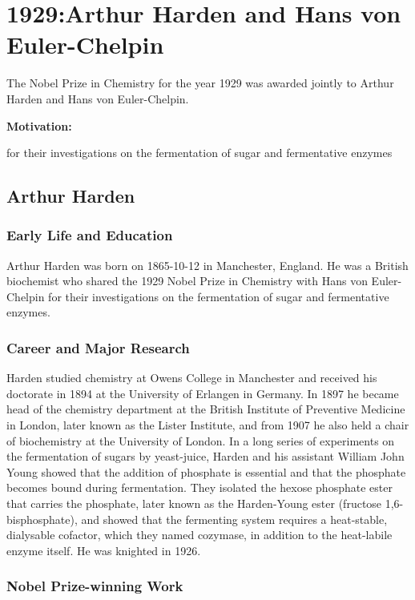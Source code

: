 \chapter{1929:Arthur Harden and Hans von Euler-Chelpin}

\label{chap:chemistry1929}

The Nobel Prize in Chemistry for the year 1929 was awarded jointly to Arthur Harden and Hans von Euler-Chelpin.

\textbf{Motivation:}

for their investigations on the fermentation of sugar and fermentative enzymes

\section{Arthur Harden}

\subsection*{Early Life and Education}

Arthur Harden was born on 1865-10-12 in Manchester, England.
He was a British biochemist who shared the 1929 Nobel Prize in Chemistry with Hans von Euler-Chelpin for their investigations on the fermentation of sugar and fermentative enzymes.

\subsection*{Career and Major Research}

Harden studied chemistry at Owens College in Manchester and received his doctorate in 1894 at the University of Erlangen in Germany.
In 1897 he became head of the chemistry department at the British Institute of Preventive Medicine in London, later known as the Lister Institute, and from 1907 he also held a chair of biochemistry at the University of London.
In a long series of experiments on the fermentation of sugars by yeast-juice, Harden and his assistant William John Young showed that the addition of phosphate is essential and that the phosphate becomes bound during fermentation.
They isolated the hexose phosphate ester that carries the phosphate, later known as the Harden-Young ester (fructose 1,6-bisphosphate), and showed that the fermenting system requires a heat-stable, dialysable cofactor, which they named cozymase, in addition to the heat-labile enzyme itself.
He was knighted in 1926.

\subsection*{Nobel Prize-winning Work}

